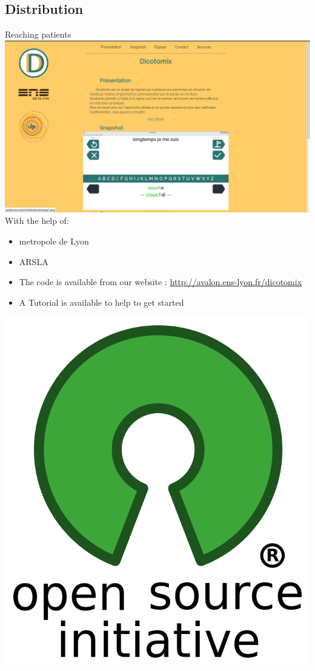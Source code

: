 \documentclass[graphics]{beamer}
\begin{document}
\subsection{Distribution}
\begin{frame}{Reaching patients}
	\hspace{7cm}
	\includegraphics[scale=0.075]{website}\\
	With the help of:
	\begin{itemize}
		\item metropole de Lyon
		\item ARSLA
		\item The code is available from our website : \hyperref[http://avalon.ens-lyon.fr/dicotomix]{http://avalon.ens-lyon.fr/dicotomix}
		\item A Tutorial is available to help to get started
	\end{itemize}
	\hspace{10cm}
	\includegraphics[scale=0.07]{opensource}
\end{frame}
\end{document}
